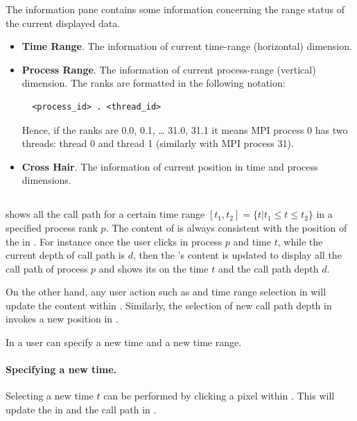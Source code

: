 The information pane contains some information concerning the range status of the current displayed data.
\begin{itemize}
 \item \textbf{Time Range}. The information of current time-range (horizontal) dimension. 
 \item \textbf{Process Range}. The information of current process-range (vertical) dimension. The ranks are formatted in the following notation:
\begin{verbatim}
  <process_id> . <thread_id>
\end{verbatim}
Hence, if the ranks are 0.0, 0.1, \dots{} 31.0, 31.1 it means MPI process 0 has two threads: thread 0 and thread 1 (similarly with MPI process 31). 

 \item \textbf{Cross Hair}. The information of current \crosshair{} position in time and process dimensions. 
\end{itemize}

\subsection{\depthview}
\label{sec:depthview}

\depthview{} shows all the call path for a certain time range $[t_1,t_2]= \{t | t_1\leq t\leq t_2\}$ in a specified process rank $p$. The content of \depthview{} is always consistent with the position of the \crosshair{} in \traceview{}.
For instance once the user clicks in process $p$ and time $t$, while the current depth of call path is $d$, then the \depthview's content is updated to display all the call path of process $p$ and shows its \crosshair{} on the time $t$ and the call path depth $d$.

On the other hand, any user action such as \crosshair{} and time range selection in \depthview{} will update the content within \traceview. Similarly, the selection of new call path depth in \callview{} invokes a new position in \depthview.

In \depthview{} a user can specify a new \crosshair{} time and a new time range.
\paragraph{Specifying a new \crosshair{} time.} Selecting a new \crosshair{} time $t$ can be performed by clicking a pixel within \depthview{}. This will update the \crosshair{} in \traceview{} and the call path in \callview.

